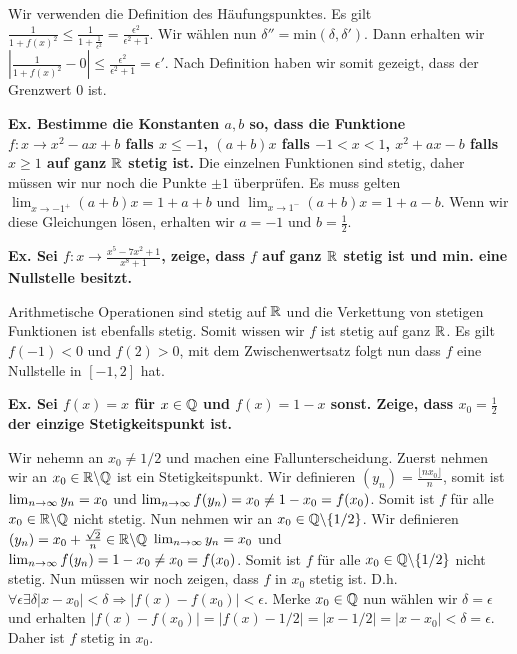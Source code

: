 Wir verwenden die Definition des Häufungspunktes. Es gilt $\frac{1}{1 + f(x)^2} \leq \frac{1}{1 + \frac{1}{\epsilon^2}} = \frac{\epsilon^2}{\epsilon^2 + 1}$.
Wir wählen nun $\delta'' = \text{min}(\delta, \delta')$. Dann erhalten wir $|\frac{1}{1 + f(x)^2} - 0| \leq \frac{\epsilon^2}{\epsilon^2 + 1} = \epsilon' $.
Nach Definition haben wir somit gezeigt, dass der Grenzwert 0 ist. \medskip

\textbf{Ex. Bestimme die Konstanten $a, b$ so, dass die Funktione $f : x \to x^2-ax+b$ falls $x \leq -1$, $(a + b)x$ falls $-1 < x < 1$, $x^2 + ax - b$ falls $x \geq 1$ auf ganz $\mathbb{R}$ stetig ist.}
Die einzelnen Funktionen sind stetig, daher müssen wir nur noch die Punkte $\pm 1$ überprüfen. Es muss gelten
$\lim_{x \to -1^+} (a + b)x = 1 + a + b$ und $\lim_{x \to 1^-} (a + b)x = 1 + a - b$. Wenn wir diese 
Gleichungen lösen, erhalten wir $a = -1$ und $b = \frac{1}{2}$. \medskip

\textbf{Ex. Sei $f : x \to \frac{x^5 - 7x^2 + 1}{x^8 + 1}$, zeige, dass $f$ auf ganz $\mathbb{R}$ stetig ist und min. eine Nullstelle besitzt.} 

Arithmetische Operationen sind stetig auf $\mathbb{R}$ und die Verkettung von stetigen Funktionen ist ebenfalls stetig.
Somit wissen wir $f$ ist stetig auf ganz $\mathbb{R}$. Es gilt $f(-1) < 0$ und $f(2) > 0$, mit dem Zwischenwertsatz
folgt nun dass $f$ eine Nullstelle in $[-1, 2]$ hat. \medskip

\textbf{Ex. Sei $f(x) = x$ für $x \in \mathbb{Q}$ und $f(x) = 1 - x$ sonst. Zeige, dass $x_0 = \frac{1}{2}$ der einzige Stetigkeitspunkt ist.} 

Wir nehemn an $x_0 \neq 1/2$ und machen eine Fallunterscheidung. Zuerst nehmen wir an $x_0 \in \mathbb{R} \backslash \mathbb{Q}$
ist ein Stetigkeitspunkt. Wir definieren $(y_n) = \frac{\lfloor n x_0\rfloor}{n}$, somit ist $\lim_{n \rightarrow \infty} y_n = x_0$ 
und $\lim_{n \rightarrow \infty} f(y_n) = x_0 \neq 1-x_0 = f(x_0)$. Somit ist $f$ für alle $x_0 \in \mathbb{R} \backslash \mathbb{Q}$ nicht stetig. 
Nun nehmen wir an $x_0 \in \mathbb{Q} \backslash \{1/2\}$. Wir definieren $(y_n) = x_0 + \frac{\sqrt{2}}{n} \in \mathbb{R} \backslash \mathbb{Q}$ 
$\lim_{n \rightarrow \infty} y_n = x_0$ und $\lim_{n \rightarrow \infty} f(y_n) = 1-x_0 \neq x_0 = f(x_0)$. Somit ist $f$ für alle 
$x_0 \in \mathbb{Q} \backslash \{1/2\}$ nicht stetig. Nun müssen wir noch zeigen, dass $f$ in $x_0$ stetig ist.
D.h. $\forall \epsilon \exists \delta |x - x_0| < \delta \Rightarrow |f(x) - f(x_0)| < \epsilon$.
Merke $x_0 \in \mathbb{Q}$ nun wählen wir $\delta = \epsilon$ und erhalten $|f(x) - f(x_0)| = |f(x) - 1/2| = |x - 1/2|
= |x - x_0| < \delta = \epsilon$. Daher ist $f$ stetig in $x_0$. \medskip

